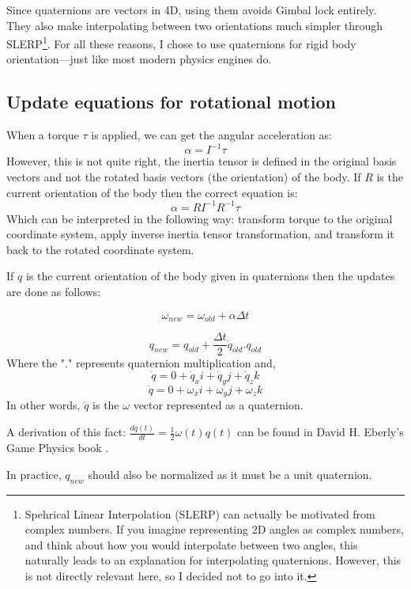 Since quaternions are vectors in 4D, using them avoids Gimbal lock entirely. They also make interpolating between two orientations much simpler through SLERP\footnote{Spehrical Linear Interpolation (SLERP) can actually be motivated from complex numbers. If you imagine representing 2D angles as complex numbers, and think about how you would interpolate between two angles, this naturally leads to an explanation for interpolating quaternions. However, this is not directly relevant here, so I decided not to go into it.}. For all these reasons, I chose to use quaternions for rigid body orientation—just like most modern physics engines do.

\subsection{Update equations for rotational motion}
When a torque $\tau$ is applied, we can get the angular acceleration as:
\[
\alpha=I^{-1}\tau
\]
However, this is not quite right, the inertia tensor is defined in the original basis vectors and not the rotated basis vectors (the orientation) of the body. If $R$ is the current orientation of the body then the correct equation is:
\[
\alpha=RI^{-1}R^{-1}\tau
\]
Which can be interpreted in the following way: transform torque to the original coordinate system, apply inverse inertia tensor transformation, and transform it back to the rotated coordinate system.

If $q$ is the current orientation of the body given in quaternions then the updates are done as follows:

\begin{equation}
\label{eq:angvel_update}
\omega_{new} = \omega_{old} + \alpha\Delta{t}
\end{equation}

\begin{equation}
\label{eq:orient_update}
q_{new} = q_{old} + \frac{\Delta{t}}{2}\dot{q}_{old}.q_{old}
\end{equation}
Where the "$.$" represents quaternion multiplication and,
\[
\dot{q}=0+\dot{q}_xi+\dot{q}_yj+\dot{q}_zk
\]
\[
\dot{q}=0+\omega_xi+\omega_yj+\omega_zk
\]
In other words, $\dot{q}$ is the $\omega$ vector represented as a quaternion.

A derivation of this fact: $\frac{dq(t)}{dt}=\frac{1}{2}\omega(t)q(t)$ can be found in David H. Eberly's Game Physics book \cite{gamephy}.

In practice, $q_{new}$ should also be normalized as it must be a unit quaternion.

